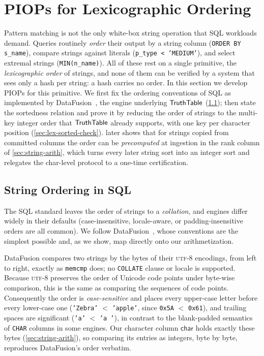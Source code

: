\doclearpage
\section{PIOPs for Lexicographic Ordering}
\label{sec:lex-order}

Pattern matching is not the only white-box string operation that SQL workloads demand. Queries routinely \emph{order} their output by a string column (\texttt{ORDER BY s\_name}), compare strings against literals (\texttt{p\_type < 'MEDIUM'}), and select extremal strings (\texttt{MIN(n\_name)}). All of these rest on a single primitive, the \emph{lexicographic order} of strings, and none of them can be verified by a system that sees only a hash per string: a hash carries no order. In this section we develop PIOPs for this primitive. We first fix the ordering conventions of SQL as implemented by DataFusion~\cite{datafusion}, the engine underlying $\mathsf{TruthTable}$ (\cref{sec:sql-string-order}); then state the sortedness relation and prove it by reducing the order of strings to the multi-key integer order that $\mathsf{TruthTable}$ already supports, with one key per character position (\cref{sec:lex-sorted-check}).  later shows that for strings copied from committed columns the order can be \emph{precomputed} at ingestion in the rank column of \cref{sec:string-arith}, which turns every later string sort into an integer sort and relegates the char-level protocol to a one-time certification.

\subsection{String Ordering in SQL}
\label{sec:sql-string-order}

The SQL standard leaves the order of strings to a \emph{collation}, and engines differ widely in their defaults (case-insensitive, locale-aware, or padding-insensitive orders are all common). We follow DataFusion~\cite{datafusion}, whose conventions are the simplest possible and, as we show, map directly onto our arithmetization.

DataFusion compares two strings by the bytes of their \textsc{utf-8} encodings, from left to right, exactly as \texttt{memcmp} does; no \texttt{COLLATE} clause or locale is supported. Because \textsc{utf-8} preserves the order of Unicode code points under byte-wise comparison, this is the same as comparing the sequences of code points. Consequently the order is \emph{case-sensitive} and places every upper-case letter before every lower-case one (\texttt{'Zebra'} $<$ \texttt{'apple'}, since \texttt{0x5A} $<$ \texttt{0x61}), and trailing spaces are significant (\texttt{'a'} $<$ \texttt{'a '}), in contrast to the blank-padded semantics of \texttt{CHAR} columns in some engines. Our character column $\mathsf{char}$ holds exactly these bytes (\cref{sec:string-arith}), so comparing its entries as integers, byte by byte, reproduces DataFusion's order verbatim.

